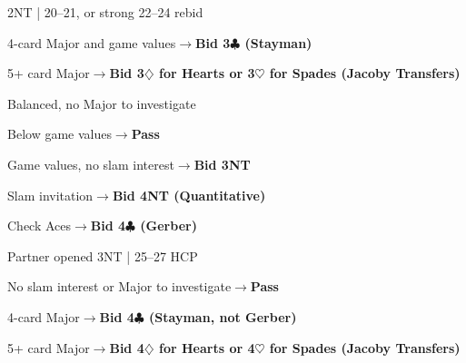 \documentclass[10pt,letterpaper]{article}
\newcommand{\C}{\ensuremath{\clubsuit}}
\newcommand{\D}{\ensuremath{\diamondsuit}}
\newcommand{\Hh}{\ensuremath{\heartsuit}}
\begin{document}
\begin{minipage}[t]{0.485\textwidth}\vspace{0pt}

\begin{guidecard}{2NT | 20--21, or strong 22--24 rebid}
\begin{branches}
\item 4-card Major and game values\;\ensuremath{\longrightarrow}\;\textbf{Bid 3\C{} (Stayman)}
\item 5+ card Major\;\ensuremath{\longrightarrow}\;\textbf{Bid 3\D{} for Hearts or 3\Hh{} for Spades (Jacoby Transfers)}
\item Balanced, no Major to investigate
\begin{branches}
\item Below game values\;\ensuremath{\longrightarrow}\;\textbf{Pass}
\item Game values, no slam interest\;\ensuremath{\longrightarrow}\;\textbf{Bid 3NT}
\item Slam invitation\;\ensuremath{\longrightarrow}\;\textbf{Bid 4NT (Quantitative)}
\end{branches}
\item Check Aces\;\ensuremath{\longrightarrow}\;\textbf{Bid 4\C{} (Gerber)}
\end{branches}
\end{guidecard}

\begin{guidecard}{Partner opened 3NT | 25--27 HCP}
\begin{branches}
\item No slam interest or Major to investigate\;\ensuremath{\longrightarrow}\;\textbf{Pass}
\item 4-card Major\;\ensuremath{\longrightarrow}\;\textbf{Bid 4\C{} (Stayman, not Gerber)}
\item 5+ card Major\;\ensuremath{\longrightarrow}\;\textbf{Bid 4\D{} for Hearts or 4\Hh{} for Spades (Jacoby Transfers)}
\end{branches}
\end{guidecard}

\end{minipage}
\end{document}
